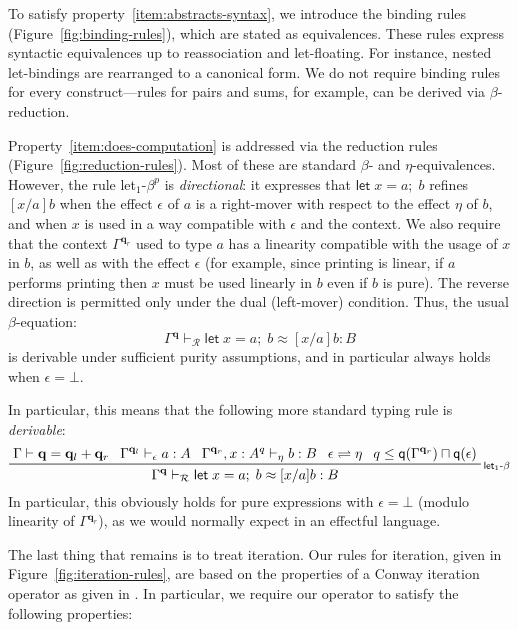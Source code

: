 \documentclass[acmsmall,screen,review]{acmart}
\newcommand{\mc}[1]{\ensuremath{\mathcal{#1}}}
\newcommand{\mb}[1]{\ensuremath{\mathbf{#1}}}
\newcommand{\ms}[1]{\ensuremath{\mathsf{#1}}}
\newcommand{\letexpr}[3]{\ensuremath{\ms{let}\;#1 = #2;\;#3}}
\newcommand{\qsp}[4]{#1 \vdash #2 = #3 + #4}
\newcommand{\rle}[1]{{\scriptsize\textsf{#1}}}
\newcommand{\hasty}[4]{#1 \vdash_{#2} #3: {#4}}
\newcommand{\teqv}{\approx}
\newcommand{\tmeq}[5]{#1 \vdash_{#2} #3 \teqv #4 : {#5}}
\newcommand{\slides}{\rightleftharpoons}
\newcommand{\alquant}{\ms{q}}
\begin{document}
To satisfy property~\ref{item:abstracts-syntax}, we introduce the binding rules
(Figure~\ref{fig:binding-rules}), which are stated as equivalences. These rules express syntactic
equivalences up to reassociation and let-floating. For instance, nested let-bindings are rearranged
to a canonical form. We do not require binding rules for every construct—rules for pairs and sums,
for example, can be derived via $\beta$-reduction.

Property~\ref{item:does-computation} is addressed via the reduction rules
(Figure~\ref{fig:reduction-rules}). Most of these are standard $\beta$- and $\eta$-equivalences.
However, the rule \textsf{let$_1$-$\beta^p$} is \emph{directional}: it expresses that
$\letexpr{x}{a}{b}$ refines $[x/a]b$ when the effect $\epsilon$ of $a$ is a right-mover with respect
to the effect $\eta$ of $b$, and when $x$ is used in a way compatible with $\epsilon$ and the
context. We also require that the context $\Gamma^{\mb{q}_r}$ used to type $a$ has a linearity
compatible with the usage of $x$ in $b$, as well as with the effect $\epsilon$ (for example, since
printing is linear, if $a$ performs printing then $x$ must be used linearly in $b$ even if $b$ is
pure). The reverse direction is permitted only under the dual (left-mover) condition. Thus, the
usual $\beta$-equation:
\[
\tmeq{\Gamma^{\mb{q}}}{\mc{R}}{\letexpr{x}{a}{b}}{[x/a]b}{B}
\]
is derivable under sufficient purity assumptions, and in particular always holds when $\epsilon =
\bot$.

In particular, this means that the following more standard typing rule is \emph{derivable}:
\begin{equation}
  \prftree[r]{\rle{let$_1$-$\beta$}}
  {\qsp{\Gamma}{\mb{q}}{\mb{q}_l}{\mb{q}_r}}
  {\hasty{\Gamma^{\mb{q}_l}}{\epsilon}{a}{A}}
  {\hasty{\Gamma^{\mb{q}_r}, x : A^q}{\eta}{b}{B}}
  {\epsilon \slides \eta}
  {q \leq \alquant(\Gamma^{\mb{q}_r}) \sqcap \alquant(\epsilon)}
  {
    \tmeq{\Gamma^{\mb{q}}}{\mc{R}}{\letexpr{x}{a}{b}}{[x/a]b}{B}
  }
\end{equation}
In particular, this obviously holds for pure expressions with $\epsilon = \bot$ (modulo linearity of
$\Gamma^{\mb{q}_r}$), as we would normally expect in an effectful language.

The last thing that remains is to treat iteration. Our rules for iteration, given in
Figure~\ref{fig:iteration-rules}, are based on the properties of a Conway iteration operator as
given in \citet{coinductive-resumption-levy-goncharov-19}. In particular, we require our operator to
satisfy the following properties:
%
\end{document}
